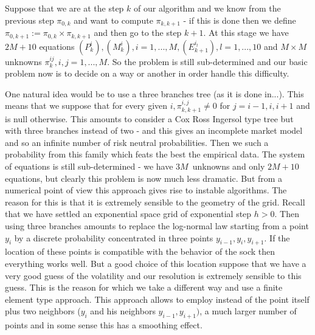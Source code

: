 \documentclass[a4paper]{article}
\begin{document}
Suppose that we are at the step $k$ of our algorithm and we know from the
previous step $\pi _{0,k}$ and want to compute $\pi _{k,k+1}$ - if this is
done then we define $\pi _{0,k+1}:=\pi _{0,k}\times \pi _{k,k+1}$ and then
go to the step $k+1.$ At this stage we have $2M+10$ equations $%
(P_{k}^{i}),(M_{k}^{i}),i=1,...,M,(E_{k+1}^{i_{l}}),l=1,...,10$ and $M\times
M$ unknowns $\pi _{k}^{ij},i,j=1,...,M.$ So the problem is still
sub-determined and our basic problem now is to decide on a way or another in
order handle this difficulty.

One natural idea would be to use a three branches tree (as it is done
in...). This means that we suppose that for every given $i,\pi
_{k,k+1}^{i,j}\neq 0$ for $j=i-1,i,i+1$ and is null otherwise. This amounts
to consider a Cox Ross Ingersol type tree but with three branches instead of
two - and this gives an incomplete market model and so an infinite number of
risk neutral probabilities. Then we such a probability from this family
which feats the best the empirical data. The system of equations is still
sub-determined - we have $3M\,$ unknowns and only $2M+10$ equations, but
clearly this problem is now much less dramatic. But from a numerical point
of view this approach gives rise to instable algorithms. The reason for this
is that it is extremely sensible to the geometry of the grid. Recall that we
have settled an exponential space grid of exponential step $h>0.$ Then using
three branches amounts to replace the log-normal law starting from a point $%
y_{i}$ by a discrete probability concentrated in three points $%
y_{i-1},y_{i},y_{i+1}$. If the location of these points is compatible with
the behavior of the sock then everything works well. But a good choice of
this location suppose that we have a very good guess of the volatility and
our resolution is extremely sensible to this guess. This is the reason for
which we take a different way and use a finite element type approach. This
approach allows to employ instead of the point itself plus two neighbors ($%
y_{i}$ and his neighbors $y_{i-1},y_{i+1})$, a much larger number of points
and in some sense this has a smoothing effect.
\end{document}
